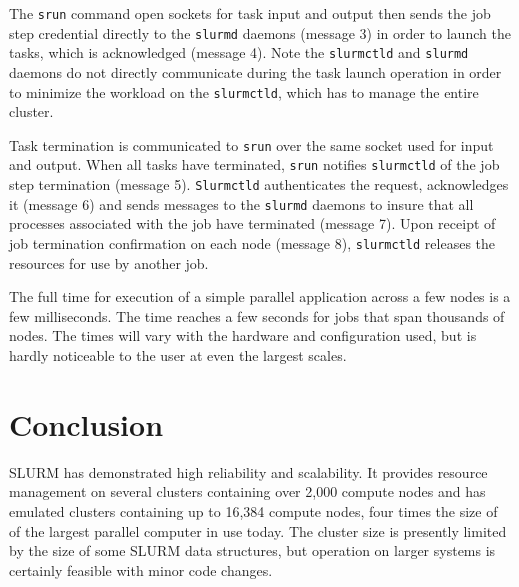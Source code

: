 \documentclass{../common/acm}
\begin{document}
The {\tt srun} command open sockets for task input and output then
sends the job step credential directly to the {\tt slurmd} daemons 
(message 3) in order to launch the tasks, which is acknowledged
(message 4).
Note the {\tt slurmctld} and {\tt slurmd} daemons do not directly 
communicate during the task launch operation in order to minimize the 
workload on the {\tt slurmctld}, which has to manage the entire 
cluster.

Task termination is communicated to {\tt srun} over the same 
socket used for input and output. 
When all tasks have terminated, {\tt srun} notifies {\tt slurmctld} 
of the job step termination (message 5).
{\tt Slurmctld} authenticates the request, acknowledges it 
(message 6) and sends messages to the {\tt slurmd} daemons to 
insure that all processes associated with the job have 
terminated (message 7). 
Upon receipt of job termination confirmation on each node (message 8), 
{\tt slurmctld} releases the resources for use by another job.

The full time for execution of a simple parallel application across 
a few nodes is a few milliseconds. 
The time reaches a few seconds for jobs that span thousands of 
nodes.
The times will vary with the hardware and configuration used, 
but is hardly noticeable to the user at even the largest scales.

\section{Conclusion}

SLURM has demonstrated high reliability and scalability.
It provides resource management on several clusters containing 
over 2,000 compute nodes and has emulated clusters containing 
up to 16,384 compute nodes, four times the size of of the 
largest parallel computer in use today. 
The cluster size is presently limited by the size of some SLURM 
data structures, but operation on larger systems is certainly 
feasible with minor code changes.

\raggedright



\end{document}
